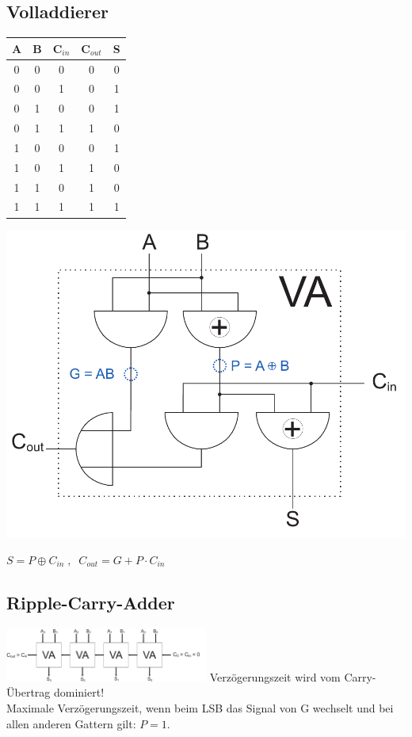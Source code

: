 \documentclass[a4paper,twocolumn,10pt]{article}
\begin{document}
\subsection*{Volladdierer}
\begin{minipage}[b]{0.23\textwidth}
\centering
\begin{tabular}[b]{@{}|c|c|c|c|c|}
\hline \textbf{A} & \textbf{B} & \textbf{C$_{in}$} & \textbf{C$_{out}$} & \textbf{S} \\ 
\hline 0 & 0 & 0 & 0 & 0 \\ 
\hline 0 & 0 & 1 & 0 & 1 \\
\hline 0 & 1 & 0 & 0 & 1 \\
\hline 0 & 1 & 1 & 1 & 0 \\
\hline 1 & 0 & 0 & 0 & 1 \\
\hline 1 & 0 & 1 & 1 & 0 \\
\hline 1 & 1 & 0 & 1 & 0 \\
\hline 1 & 1 & 1 & 1 & 1 \\
\hline 
\end{tabular}
\end{minipage}
\hfill
\begin{minipage}[b]{0.27\textwidth}
\centering
\includegraphics[width=\textwidth]{Grafiken/Volladdierer}
\end{minipage}
$S=P\oplus C_{in}\;,\;\; C_{out}=G+P\cdot C_{in}$ 

\subsection*{Ripple-Carry-Adder}
\includegraphics[width=0.5\textwidth]{Grafiken/Ripple-Carry}
Verzögerungszeit wird vom Carry-Übertrag dominiert!\\
Maximale Verzögerungszeit, wenn beim LSB das Signal von G wechselt und bei allen anderen Gattern gilt: $P=1$.
\end{document}
